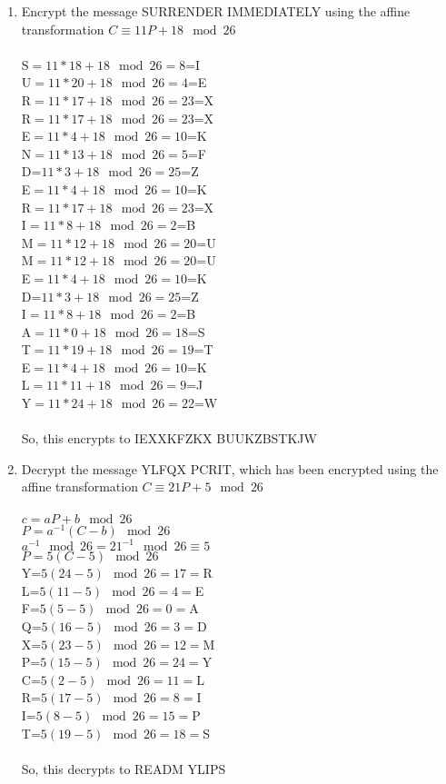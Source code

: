 \documentclass[]{article}
\begin{document}
\begin{enumerate}
    \item Encrypt the message SURRENDER IMMEDIATELY using the affine transformation $C \equiv 11P + 18 \mod 26$ 
    \\\\S$=11*18 + 18 \mod 26 = 8$=I
    \\U$=11*20 + 18 \mod 26 = 4$=E
    \\R$=11*17 + 18 \mod 26 = 23$=X
    \\R$=11*17 + 18 \mod 26 = 23$=X
    \\E$=11*4 + 18 \mod 26 = 10$=K
    \\N$=11*13 + 18 \mod 26 = 5$=F
    \\D=$11*3 + 18 \mod 26 = 25$=Z
    \\E$=11*4 + 18 \mod 26 = 10$=K
    \\R$=11*17 + 18 \mod 26 = 23$=X
    \\I$=11*8 + 18 \mod 26 = 2$=B
    \\M$=11*12 + 18 \mod 26 = 20$=U
    \\M$=11*12 + 18 \mod 26 = 20$=U
    \\E$=11*4 + 18 \mod 26 = 10$=K
    \\D=$11*3 + 18 \mod 26 = 25$=Z
    \\I$=11*8 + 18 \mod 26 = 2$=B
    \\A$=11*0 + 18 \mod 26 = 18$=S
    \\T$=11*19 + 18 \mod 26 = 19$=T
    \\E$=11*4 + 18 \mod 26 = 10$=K
    \\L$=11*11 + 18 \mod 26 = 9$=J
    \\Y$=11*24 + 18 \mod 26 = 22$=W
    \\\\So, this encrypts to IEXXKFZKX BUUKZBSTKJW

    \item Decrypt the message YLFQX PCRIT, which has been encrypted using the affine transformation $C \equiv 21P + 5 \mod 26$
    \\\\$c = aP + b \mod 26$
    \\$P=a^{-1}(C-b) \mod 26$
    \\$a^{-1} \mod 26 = 21^{-1} \mod 26 \equiv 5$
    \\$P=5(C-5) \mod 26$
    \\Y=$5(24-5) \mod 26 = 17 = $R
    \\L=$5(11-5) \mod 26 = 4 = $E
    \\F=$5(5-5) \mod 26 = 0 = $A
    \\Q=$5(16-5) \mod 26 = 3 = $D
    \\X=$5(23-5) \mod 26 = 12 = $M
    \\P=$5(15-5) \mod 26 = 24 = $Y
    \\C=$5(2-5) \mod 26 = 11 = $L
    \\R=$5(17-5) \mod 26 = 8 = $I
    \\I=$5(8-5) \mod 26 = 15 = $P
    \\T=$5(19-5) \mod 26 = 18 = $S
    \\\\So, this decrypts to READM YLIPS


\end{enumerate}
\end{document}
